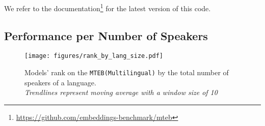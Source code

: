 We refer to the documentation\footnote{\url{https://github.com/embeddings-benchmark/mteb}} for the latest version of this code.

\subsection{Performance per Number of Speakers}
\label{sec:appendix-perf-by-speakers}

\begin{figure}[!ht]
    \centering
    \texttt{[image: figures/rank\_by\_lang\_size.pdf]}
    \caption{Models' rank on the \texttt{MTEB(Multilingual)} by the total number of speakers of a language.\\
    \textit{Trendlines represent moving average with a window size of 10}
    }
    \label{fig:rank_by_lang_size}
\end{figure}

